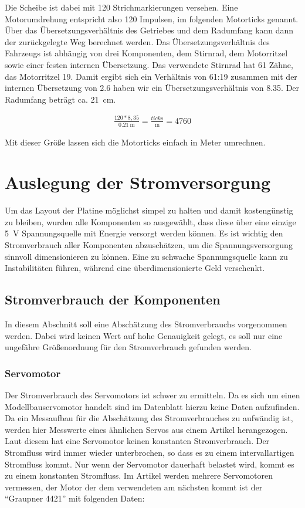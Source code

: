 Die Scheibe ist dabei mit 120 Strichmarkierungen versehen. Eine Motorumdrehung entspricht also 120 Impulsen, im folgenden Motorticks genannt. Über das Übersetzungsverhältnis des Getriebes und dem Radumfang kann dann 
der zurückgelegte Weg berechnet werden. Das Übersetzungsverhältnis des Fahrzeugs ist abhängig von drei Komponenten, dem Stirnrad, dem Motorritzel sowie einer festen internen Übersetzung. Das verwendete Stirnrad hat
61 Zähne, das Motorritzel 19. Damit ergibt sich ein Verhältnis von 61:19 zusammen mit der internen Übersetzung von \num{2,6} \cite{uebersetzung}
haben wir ein Übersetzungsverhältnis von \num{8,35}. Der Radumfang beträgt ca. \SI{21}{\centi\meter}.

\begin{align}
\frac{120*8,35}{\SI{0,21}{\meter}}=\frac{ticks}{\si{\meter}}=4760
\end{align}

Mit dieser Größe lassen sich die Motorticks einfach in Meter umrechnen. 

\section{Auslegung der Stromversorgung}

Um das Layout der Platine möglichst simpel zu halten und damit kostengünstig zu bleiben, wurden alle Komponenten so ausgewählt, dass diese über eine einzige \SI{5}{\volt} Spannungsquelle mit Energie versorgt werden können.
Es ist wichtig den Stromverbrauch aller Komponenten abzuschätzen, um die Spannungsversorgung sinnvoll dimensionieren zu kön\-nen. Eine zu schwache Spannungsquelle kann zu Instabilitäten führen,
während eine überdimensionierte Geld verschenkt.

\subsection{Stromverbrauch der Komponenten}
In diesem Abschnitt soll eine Abschätzung des Stromverbrauchs vorgenommen werden. Dabei wird keinen Wert auf hohe Genauigkeit gelegt, es soll nur eine ungefähre Größenordnung für den Stromverbrauch gefunden werden.

\subsubsection{Servomotor}
Der Stromverbrauch des Servomotors ist schwer zu ermitteln. Da es sich um einen Modellbauservomotor handelt 
sind im Datenblatt hierzu keine Daten aufzufinden. Da ein Messaufbau für die Abschätzung des Stromverbrauches
zu aufwändig ist, werden hier Messwerte eines ähnlichen Servos aus einem Artikel \cite{website-servo} herangezogen.
Laut diesem hat eine Servomotor keinen konstanten Stromverbrauch. Der Stromfluss wird immer wieder unterbrochen, so dass es zu einem intervallartigen Stromfluss kommt.
Nur wenn der Servomotor dauerhaft belastet wird, kommt es zu einem konstanten Stromfluss.
Im Artikel werden mehrere Servomotoren vermessen, der Motor der dem verwendeten am nächsten kommt ist der ``Graupner 4421'' mit folgenden Daten:


